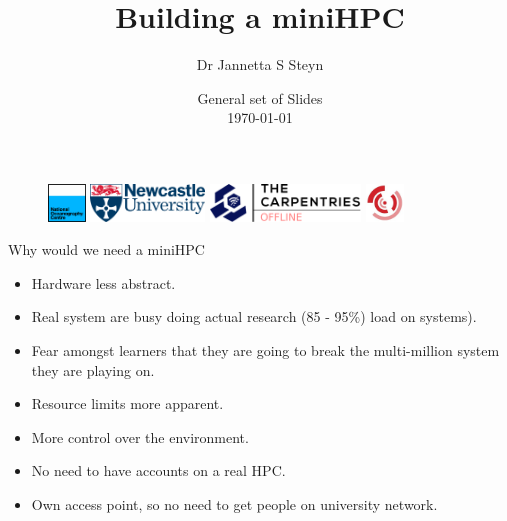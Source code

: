 \documentclass[11pt]{beamer}
\title{Building a miniHPC}
\author{Dr Jannetta S Steyn}
\institute[NCL]{Newcastle University \\ \smallskip \textit{jannetta.steyn@newcastle.ac.uk}}
\date[\today]{General set of Slides \\ \today}
\begin{document}
\begin{frame}[plain]
    \maketitle
    	\begin{figure}
    	\includegraphics[height=10mm]{NOC.png}
    	\includegraphics[height=10mm]{NCL.png}
		\includegraphics[height=10mm]{OFFLINE.png}
		\includegraphics[height=10mm]{SSI.png}
    \end{figure}
\end{frame}
\begin{frame}{Why would we need a miniHPC}
	\begin{itemize}

		\item Hardware less abstract.
		\item Real system are busy doing actual research (85 - 95\%) load on systems).
		\item Fear amongst learners that they are going to break the multi-million system they are playing on.
		\item Resource limits more apparent.
		\item More control over the environment.
		\item No need to have accounts on a real HPC.
		\item Own access point, so no need to get people on university network.
	\end{itemize}
\end{frame}
\end{document}
